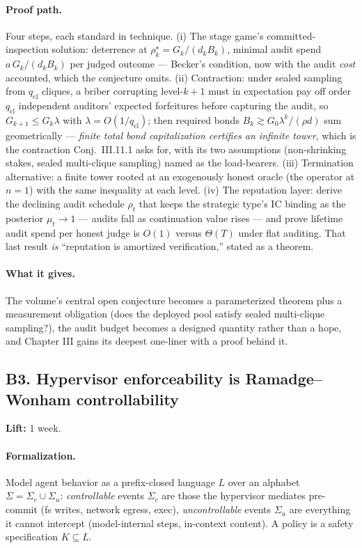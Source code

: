 \documentclass[11pt,a4paper]{article}
\newcommand{\lift}[1]{\noindent\textbf{Lift:} #1.}
\newcommand{\gives}{\paragraph{What it gives.}}
\newcommand{\form}{\paragraph{Formalization.}}
\newcommand{\proofpath}{\paragraph{Proof path.}}
\begin{document}
\proofpath Four steps, each standard in technique. (i) The stage game's committed-inspection solution: deterrence at $\rho_k^\star = G_k/(d_k B_k)$, minimal audit spend $a\,G_k/(d_k B_k)$ per judged outcome --- Becker's condition, now with the audit \emph{cost} accounted, which the conjecture omits. (ii) Contraction: under sealed sampling from $q_{\mathrm{cl}}$ cliques, a briber corrupting level-$k{+}1$ must in expectation pay off order $q_{\mathrm{cl}}$ independent auditors' expected forfeitures before capturing the audit, so $G_{k+1} \le G_k\lambda$ with $\lambda = O(1/q_{\mathrm{cl}})$; then required bonds $B_k \gtrsim G_0\lambda^k/(\rho d)$ sum geometrically --- \emph{finite total bond capitalization certifies an infinite tower}, which is the contraction Conj.~III.11.1 asks for, with its two assumptions (non-shrinking stakes, sealed multi-clique sampling) named as the load-bearers. (iii) Termination alternative: a finite tower rooted at an exogenously honest oracle (the operator at $n{=}1$) with the same inequality at each level. (iv) The reputation layer: derive the declining audit schedule $\rho_t$ that keeps the strategic type's IC binding as the posterior $\mu_t \to 1$ --- audits fall as continuation value rises --- and prove lifetime audit spend per honest judge is $O(1)$ versus $\Theta(T)$ under flat auditing. That last result \emph{is} ``reputation is amortized verification,'' stated as a theorem.

\gives The volume's central open conjecture becomes a parameterized theorem plus a measurement obligation (does the deployed pool satisfy sealed multi-clique sampling?), the audit budget becomes a designed quantity rather than a hope, and Chapter III gains its deepest one-liner with a proof behind it.

\subsection{B3. Hypervisor enforceability is Ramadge--Wonham controllability}
\lift{1 week}

\form Model agent behavior as a prefix-closed language $L$ over an alphabet $\Sigma = \Sigma_c \cup \Sigma_u$: \emph{controllable} events $\Sigma_c$ are those the hypervisor mediates pre-commit (fs writes, network egress, exec), \emph{uncontrollable} events $\Sigma_u$ are everything it cannot intercept (model-internal steps, in-context content). A policy is a safety specification $K \subseteq L$.
\end{document}
